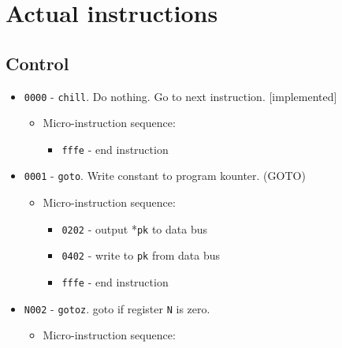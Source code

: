 \documentclass{article}
\def\pkptrout{\Verb|0202| - output *\Verb|pk| to data bus}
\def\datatopk{\Verb|0402| - write to \Verb|pk| from data bus}
\def\datatotmpa{\Verb|2402| - write to \Verb|tmpA| from data bus}
\def\tmpatopkifz{\Verb|0602| - write to \Verb|pk| from \Verb|tmpA| if data bus is zero; increment otherwise}
\def\regtodata#1{\Verb|#1003| - output \Verb|r#1| to data bus}
\def\done{\Verb|fffe| - end instruction}
\begin{document}
\newpage

\section{Actual instructions}

\subsection{Control}
\begin{itemize}
    \item \Verb|0000| - \Verb|chill|. Do nothing. Go to next instruction. [implemented]
    \begin{itemize}
        \item Micro-instruction sequence:
        \begin{itemize}
            \item \done
        \end{itemize}
    \end{itemize}

    \item \Verb|0001| - \Verb|goto|. Write constant to program kounter. (GOTO)
    \begin{itemize}
        \item Micro-instruction sequence:
        \begin{itemize}
            \item \pkptrout
            \item \datatopk
            \item \done
        \end{itemize}
    \end{itemize}

    \item \Verb|N002| - \Verb|gotoz|. goto if register \Verb|N| is zero.
    \begin{itemize}
        \item Micro-instruction sequence:
    \end{itemize}


\end{itemize}
\end{document}
